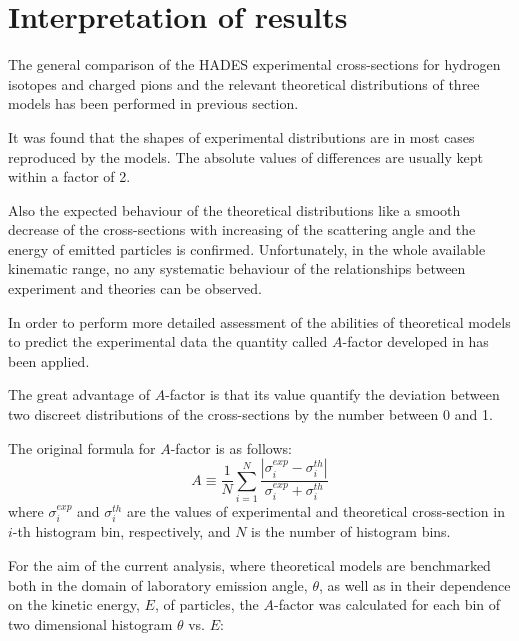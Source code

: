 \section{Interpretation of results}

The general comparison of the HADES experimental
cross-sections for hydrogen isotopes and charged pions and the relevant theoretical distributions of three models has been performed in previous section. 

It was found that the shapes of experimental distributions are in most cases reproduced by the models. The absolute values of differences are usually kept within a factor of 2.

Also the expected behaviour of the theoretical distributions like a smooth decrease of the cross-sections with increasing of the scattering angle and the energy of emitted particles is confirmed. 
Unfortunately, in the whole available kinematic range,  no any systematic behaviour of the 
relationships between experiment and theories can  be observed. 


In order to perform more detailed assessment of the abilities of theoretical models to predict the experimental data the quantity called $A$-factor developed in \cite{sharma2017ranking,singh2018predictive} has been applied.

The great advantage of $A$-factor is that its value quantify the deviation between two discreet distributions of the cross-sections by the number between 0 and 1.

The original formula for $A$-factor is as follows:
\begin{equation}
\label{A_factor_1}
A \equiv \frac{1}{N}   \sum_{i=1}^{N}  \frac{\left |\sigma^{exp}_{i}
- \sigma^{th}_{i}\right |}{\sigma^{exp}_{i} + \sigma^{th}_{i}}
\end{equation}
where $\sigma^{exp}_{i}$ and $\sigma^{th}_{i}$ are the values of
experimental and theoretical cross-section in $i$-th histogram bin,
respectively, and $N$ is the number of histogram bins.

For the aim of the current analysis, where
theoretical models are benchmarked both in the domain of laboratory emission angle, $\theta$, as well as in their dependence on the kinetic energy, $E$, of particles, the
$A$-factor was calculated for each bin of two dimensional histogram $\theta$ vs. $E$: 

